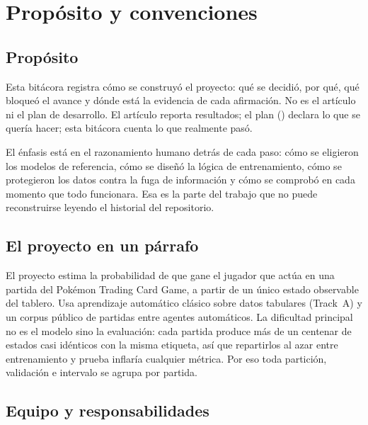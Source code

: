 \section{Prop\'osito y convenciones}
\label{sec:conventions}

\subsection{Prop\'osito}

Esta bit\'acora registra c\'omo se construy\'o el proyecto: qu\'e se decidi\'o,
por qu\'e, qu\'e bloque\'o el avance y d\'onde est\'a la evidencia de cada
afirmaci\'on. No es el art\'iculo ni el plan de desarrollo. El art\'iculo
reporta resultados; el plan () declara lo que se
quer\'ia hacer; esta bit\'acora cuenta lo que realmente pas\'o.

El \'enfasis est\'a en el razonamiento humano detr\'as de cada paso: c\'omo se
eligieron los modelos de referencia, c\'omo se dise\~n\'o la l\'ogica de
entrenamiento, c\'omo se protegieron los datos contra la fuga de
informaci\'on y c\'omo se comprob\'o en cada momento que todo funcionara.
Esa es la parte del trabajo que no puede reconstruirse leyendo el historial
del repositorio.

\subsection{El proyecto en un p\'arrafo}

El proyecto estima la probabilidad de que gane el jugador que act\'ua en una
partida del Pok\'emon Trading Card Game, a partir de un \'unico estado
observable del tablero. Usa aprendizaje autom\'atico cl\'asico sobre datos
tabulares (Track~A) y un corpus p\'ublico de partidas entre agentes
autom\'aticos. La dificultad principal no es el modelo sino la evaluaci\'on:
cada partida produce m\'as de un centenar de estados casi id\'enticos con la
misma etiqueta, as\'i que repartirlos al azar entre entrenamiento y prueba
inflar\'ia cualquier m\'etrica. Por eso toda partici\'on, validaci\'on e
intervalo se agrupa por partida.

\subsection{Equipo y responsabilidades}

